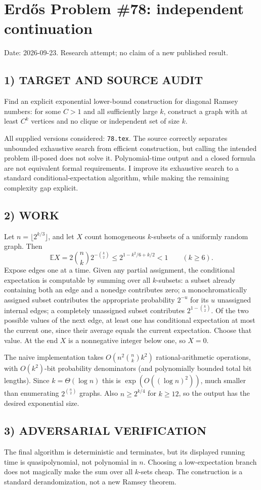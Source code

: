\section{Erd\H{o}s Problem \#78: independent continuation}
\noindent Date: 2026-09-23. Research attempt; no claim of a new published result.
\subsection{1) TARGET AND SOURCE AUDIT}
Find an explicit exponential lower-bound construction for diagonal Ramsey numbers: for some $C>1$ and all sufficiently large $k$, construct a graph with at least $C^k$ vertices and no clique or independent set of size $k$.

All supplied versions considered: \texttt{78.tex}.
The source correctly separates unbounded exhaustive search from efficient construction, but calling the intended problem ill-posed does not solve it. Polynomial-time output and a closed formula are not equivalent formal requirements. I improve its exhaustive search to a standard conditional-expectation algorithm, while making the remaining complexity gap explicit.
\subsection{2) WORK}
Let $n=\lfloor2^{k/3}\rfloor$, and let $X$ count homogeneous $k$-subsets of a uniformly random graph. Then
\[
\mathbb E X=2\binom nk2^{-\binom k2}\le2^{1-k^2/6+k/2}<1\qquad(k\ge6).
\]
Expose edges one at a time. Given any partial assignment, the conditional expectation is computable by summing over all $k$-subsets: a subset already containing both an edge and a nonedge contributes zero; a monochromatically assigned subset contributes the appropriate probability $2^{-u}$ for its $u$ unassigned internal edges; a completely unassigned subset contributes $2^{1-\binom k2}$. Of the two possible values of the next edge, at least one has conditional expectation at most the current one, since their average equals the current expectation. Choose that value.
At the end $X$ is a nonnegative integer below one, so $X=0$.

The naive implementation takes $O(n^2\binom nk k^2)$ rational-arithmetic operations, with $O(k^2)$-bit probability denominators (and polynomially bounded total bit lengths). Since $k=\Theta(\log n)$ this is $\exp(O((\log n)^2))$, much smaller than enumerating $2^{\binom n2}$ graphs. Also $n\ge2^{k/4}$ for $k\ge12$, so the output has the desired exponential size.
\subsection{3) ADVERSARIAL VERIFICATION}
The final algorithm is deterministic and terminates, but its displayed running time is quasipolynomial, not polynomial in $n$. Choosing a low-expectation branch does not magically make the sum over all $k$-sets cheap. The construction is a standard derandomization, not a new Ramsey theorem.
